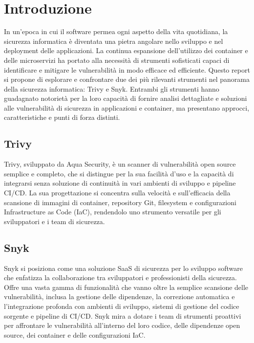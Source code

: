 \chapter{Introduzione}
In un'epoca in cui il software permea ogni aspetto della vita quotidiana, la sicurezza informatica è diventata una pietra angolare nello sviluppo e nel deployment delle applicazioni. La continua espansione dell'utilizzo dei container e delle microservizi ha portato alla necessità di strumenti sofisticati capaci di identificare e mitigare le vulnerabilità in modo efficace ed efficiente. Questo report si propone di esplorare e confrontare due dei più rilevanti strumenti nel panorama della sicurezza informatica: Trivy e Snyk. Entrambi gli strumenti hanno guadagnato notorietà per la loro capacità di fornire analisi dettagliate e soluzioni alle vulnerabilità di sicurezza in applicazioni e container, ma presentano approcci, caratteristiche e punti di forza distinti.

\section*{Trivy}

Trivy, sviluppato da Aqua Security, è un scanner di vulnerabilità open source semplice e completo, che si distingue per la sua facilità d'uso e la capacità di integrarsi senza soluzione di continuità in vari ambienti di sviluppo e pipeline CI/CD. La sua progettazione si concentra sulla velocità e sull'efficacia della scansione di immagini di container, repository Git, filesystem e configurazioni Infrastructure as Code (IaC), rendendolo uno strumento versatile per gli sviluppatori e i team di sicurezza.

\section*{Snyk}

Snyk si posiziona come una soluzione SaaS di sicurezza per lo sviluppo software che enfatizza la collaborazione tra sviluppatori e professionisti della sicurezza. Offre una vasta gamma di funzionalità che vanno oltre la semplice scansione delle vulnerabilità, inclusa la gestione delle dipendenze, la correzione automatica e l'integrazione profonda con ambienti di sviluppo, sistemi di gestione del codice sorgente e pipeline di CI/CD. Snyk mira a dotare i team di strumenti proattivi per affrontare le vulnerabilità all'interno del loro codice, delle dipendenze open source, dei container e delle configurazioni IaC.

